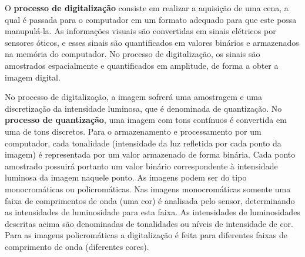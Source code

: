 	O \textbf{processo de digitalização} consiste em realizar a aquisição de uma cena, a qual é passada para o computador em um formato adequado para que este possa manupulá-la. As informações visuais são convertidas em sinais elétricos por sensores óticos, e esses sinais são quantificados em valores binários e armazenados na memória do computador. No processo de digitalização, os sinais são amostrados espacialmente e quantificados em amplitude, de forma a obter a imagem digital.
	
	No processo de digitalização, a imagem sofrerá uma amostragem e uma discretização da intensidade luminosa, que é denominada de quantização. No \textbf{processo de quantização}, uma imagem com tons contínuos é convertida em uma de tons discretos. Para o armazenamento e processamento por um computador, cada tonalidade (intensidade da luz refletida por cada ponto da imagem) é representada por um valor armazenado de forma binária. Cada ponto amostrado possuirá portanto um valor binário correspondente à intensidade luminosa da imagem naquele ponto. As imagens podem ser do tipo monocromáticas ou policromáticas. Nas imagens monocromáticas somente uma faixa de comprimentos de onda (uma cor) é analisada pelo sensor, determinando as intensidades de luminosidade para esta faixa. As intensidades de luminosidades descritas acima são denominadas de tonalidades ou níveis de intensidade de cor. Para as imagens policromáticas a digitalização é feita para diferentes faixas de comprimento de onda (diferentes cores).